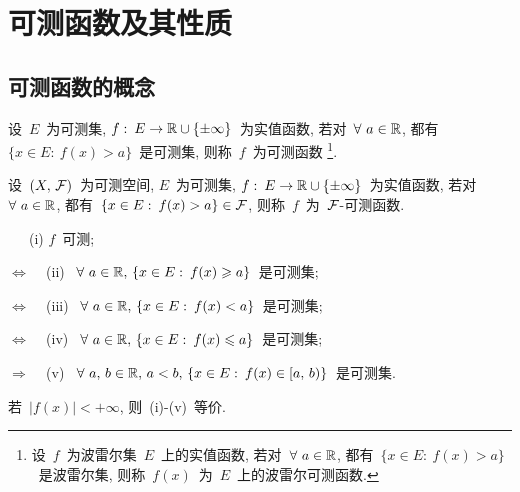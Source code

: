 \section{可测函数及其性质}

\subsection{可测函数的概念}

\begin{definition}
设~$E$~为可测集, $f: \: E \to \mathbb{R} \cup \{\pm \infty\}$~为实值函数, 若对~$\forall~a \in \mathbb{R}$, 都有~$\{x \in E: \: f(x) > a\}$~是可测集, 则称~$f$~为可测函数
\footnote{设~$f$~为波雷尔集~$E$~上的实值函数, 若对~$\forall~a \in \mathbb{R}$, 都有~$\{x \in E: \: f(x) > a\}$~是波雷尔集, 则称~$f(x)$~为~$E$~上的波雷尔可测函数.}.
\end{definition}

\begin{definition}[用可测空间描述可测函数]
设~$(X,\,\mathcal{F})$~为可测空间, $E$~为可测集, $f: \: E \to \mathbb{R} \cup \{\pm \infty\}$~为实值函数, 若对~$\forall~a \in \mathbb{R}$, 都有~$\{x \in E: \: f(x) > a\} \in \mathcal{F}$, 则称~$f$~为~$\mathcal{F}$-可测函数.
\end{definition}

\begin{proposition}[可测函数的等价定义] \label{prop311}
\quad ~~~(i) $f$~可测;\

$\Leftrightarrow$ ~ (ii) ~$\forall~a \in \mathbb{R},\,\{x \in E: \: f(x) \geqslant a\}$~是可测集;\

$\Leftrightarrow$ ~ (iii) ~$\forall~a \in \mathbb{R},\,\{x \in E: \: f(x) < a\}$~是可测集;\

$\Leftrightarrow$ ~ (iv) ~$\forall~a \in \mathbb{R},\,\{x \in E: \: f(x) \leqslant a\}$~是可测集;\

$\Rightarrow$ ~ (v) ~$\forall~a,\,b \in \mathbb{R},\, a < b, \,\{x \in E: \: f(x) \in [a,\,b) \}$~是可测集.

若~$|f(x)| < +\infty$, 则~(i)-(v)~等价.
\end{proposition}

